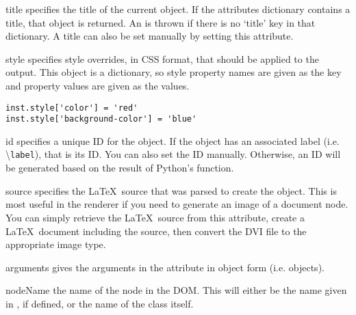 \documentclass{manual}
\newcommand{\macro}[1]{\textbackslash\texttt{#1}}
\begin{document}
\begin{memberdesc}[Macro]{title}
specifies the title of the current object.  If the attributes dictionary
contains a title, that object is returned.  An 
is thrown if there is no `title' key in that dictionary.  A title can also be 
set manually by setting this attribute.
\end{memberdesc}

\begin{memberdesc}[Macro]{style}
specifies style overrides, in CSS format, that should be applied to the
output.  This object is a dictionary, so style property names are given
as the key and property values are given as the values.
\begin{verbatim}
inst.style['color'] = 'red'
inst.style['background-color'] = 'blue'
\end{verbatim}
\end{memberdesc}

\begin{memberdesc}[Macro]{id}
specifies a unique ID for the object.  If the object has an associated 
label (i.e. \macro{label}), that is its ID.  You can also set the ID 
manually.  Otherwise, an ID will be generated based on the result of Python's
 function.
\end{memberdesc}

\begin{memberdesc}[Macro]{source}
specifies the \LaTeX\ source that was parsed to create the object.  This
is most useful in the renderer if you need to generate an image of a
document node.  You can simply retrieve the \LaTeX\ source from this 
attribute, create a \LaTeX\ document including the source, then convert
the DVI file to the appropriate image type.
\end{memberdesc}

\begin{memberdesc}[Macro]{arguments}
gives the arguments in the  attribute in object form 
(i.e.  objects).
\end{memberdesc}

\begin{memberdesc}[Macro]{nodeName}
the name of the node in the DOM.  This will either be the name given in
, if defined, or the name of the class itself.
\end{memberdesc}
\end{document}
